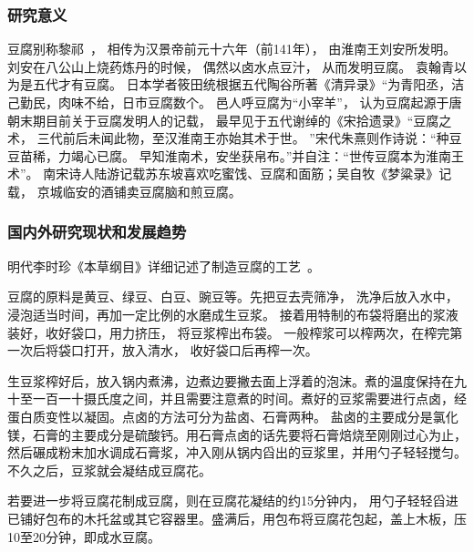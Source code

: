\documentclass{nsfc}
\begin{document}




\subsubsection{研究意义}
豆腐别称黎祁~\cite{tsai1981studies,zheng2020tofu}，
相传为汉景帝前元十六年（前141年），
由淮南王刘安所发明。
刘安在八公山上烧药炼丹的时候，
偶然以卤水点豆汁，
从而发明豆腐。
袁翰青以为是五代才有豆腐。
日本学者筱田统根据五代陶谷所著《清异录》“为青阳丞，洁己勤民，肉味不给，日市豆腐数个。
邑人呼豆腐为“小宰羊”，
认为豆腐起源于唐朝末期目前关于豆腐发明人的记载，
最早见于五代谢绰的《宋拾遗录》“豆腐之术，
三代前后未闻此物，至汉淮南王亦始其术于世。
”宋代朱熹则作诗说：“种豆豆苗稀，力竭心已腐。
早知淮南术，安坐获帛布。”并自注：“世传豆腐本为淮南王术”。
南宋诗人陆游记载苏东坡喜欢吃蜜饯、豆腐和面筋；吴自牧《梦粱录》记载，
京城临安的酒铺卖豆腐脑和煎豆腐。



\subsubsection{国内外研究现状和发展趋势}

明代李时珍《本草纲目》详细记述了制造豆腐的工艺~\cite{tsai1981studies,zheng2020tofu}。

豆腐的原料是黄豆、绿豆、白豆、豌豆等。先把豆去壳筛净，
洗净后放入水中，浸泡适当时间，再加一定比例的水磨成生豆浆。
接着用特制的布袋将磨出的浆液装好，收好袋口，用力挤压，
将豆浆榨出布袋。
一般榨浆可以榨两次，在榨完第一次后将袋口打开，放入清水，
收好袋口后再榨一次。

生豆浆榨好后，放入锅内煮沸，边煮边要撇去面上浮着的泡沫。煮的温度保持在九十至一百一十摄氏度之间，并且需要注意煮的时间。煮好的豆浆需要进行点卤，经蛋白质变性以凝固。点卤的方法可分为盐卤、石膏两种。
盐卤的主要成分是氯化镁，石膏的主要成分是硫酸钙。用石膏点卤的话先要将石膏焙烧至刚刚过心为止，然后碾成粉末加水调成石膏浆，冲入刚从锅内舀出的豆浆里，并用勺子轻轻搅匀。不久之后，豆浆就会凝结成豆腐花。

若要进一步将豆腐花制成豆腐，则在豆腐花凝结的约15分钟内，
用勺子轻轻舀进已铺好包布的木托盆或其它容器里。盛满后，用包布将豆腐花包起，盖上木板，压10至20分钟，即成水豆腐。
\end{document}
